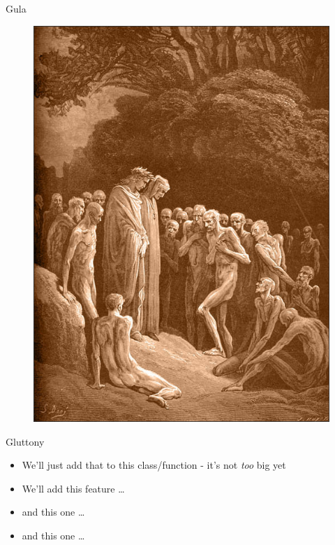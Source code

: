 \documentclass[12pt,xcolor=x11names]{beamer}
\begin{document}
\begin{frame}{Gula}
    \begin{figure}
        \centering \includegraphics[height=0.75\textheight]{gluttony.jpg}
    \end{figure}
\end{frame}
\begin{frame}{Gluttony}
    \begin{itemize}
        \item We'll just add that to this class/function - it's not \emph{too} big yet
        \item We'll add this feature \dots
            \pause
        \item and this one \ldots
            \pause
        \item and this one \ldots
    \end{itemize}
\end{frame}
\end{document}
